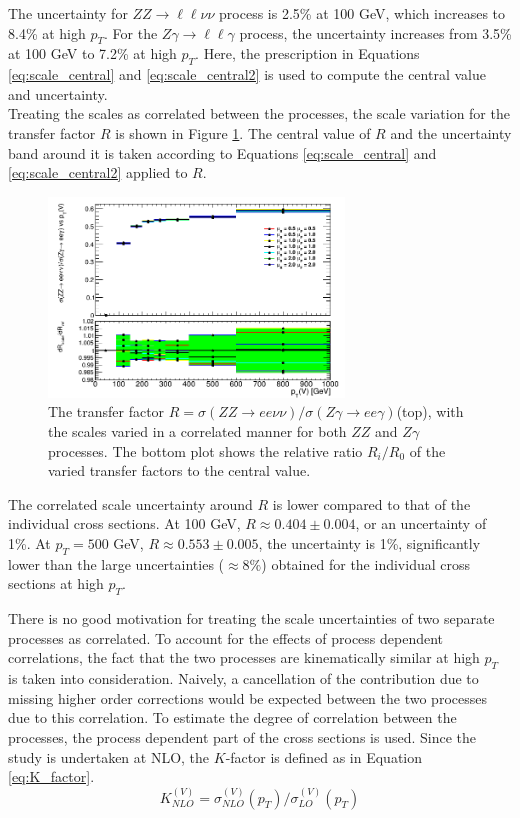\documentclass[12pt,a4paper,openright,twoside]{report}
\newcommand{\ZZ}{$ZZ\to \ell\ell\nu\nu$ }
\newcommand{\Zg}{$Z\gamma\to \ell\ell\gamma$ }
\newcommand{\myequations}[1]{%
\addcontentsline{equ}{myequations}{\protect\numberline{\theequation}#1}\par}
\begin{document}
The uncertainty for \ZZ process is 2.5\% at 100 GeV, which increases to 8.4\% at high $p_T$. For the \Zg process, the uncertainty increases from 3.5\% at 100 GeV to 7.2\% at high $p_T$. Here, the prescription in Equations \ref{eq:scale_central} and \ref{eq:scale_central2} is used to compute the central value and uncertainty.\\ Treating the scales as correlated between the processes, the scale variation for the transfer factor $R$ is shown in Figure \ref{fig:R_scale}. The central value of $R$ and the uncertainty band around it is taken according to Equations \ref{eq:scale_central} and \ref{eq:scale_central2} applied to $R$.
\begin{figure}[H]
\centering
\includegraphics[width=0.7\textwidth]{R_scale.png}
\caption{The transfer factor $R = \sigma(ZZ\to ee\nu\nu)/\sigma(Z\gamma\to ee\gamma)$(top), with the scales varied in a correlated manner for both $ZZ$ and $Z\gamma$ processes. The bottom plot shows the relative ratio $R_i/R_0$ of the varied transfer factors to the central value.}
\label{fig:R_scale}
\end{figure}
The correlated scale uncertainty around $R$ is lower compared to that of the individual cross sections. At 100 GeV, $R \approx 0.404 \pm 0.004$, or an uncertainty of 1\%. At $p_T = 500$ GeV, $R\approx 0.553 \pm 0.005$, the uncertainty is 1\%, significantly lower than the large uncertainties ($\approx 8\%$) obtained for the individual cross sections at high $p_T$.

There is no good motivation for treating the scale uncertainties of two separate processes as correlated. To account for the effects of process dependent correlations, the fact that the two processes are kinematically similar at high $p_T$ is taken into consideration. Naively, a cancellation of the contribution due to missing higher order corrections would be expected between the two processes due to this correlation. To estimate the degree of correlation between the processes, the process dependent part of the cross sections is used. Since the study is undertaken at NLO, the $K$-factor is defined as in Equation \ref{eq:K_factor}.
\begin{equation}
K_{NLO}^{(V)} = \sigma_{NLO}^{(V)}(p_T)/\sigma_{LO}^{(V)}(p_T)
\label{eq:K_factor}
\end{equation}
\myequations{$K$-factor definition}
\end{document}
